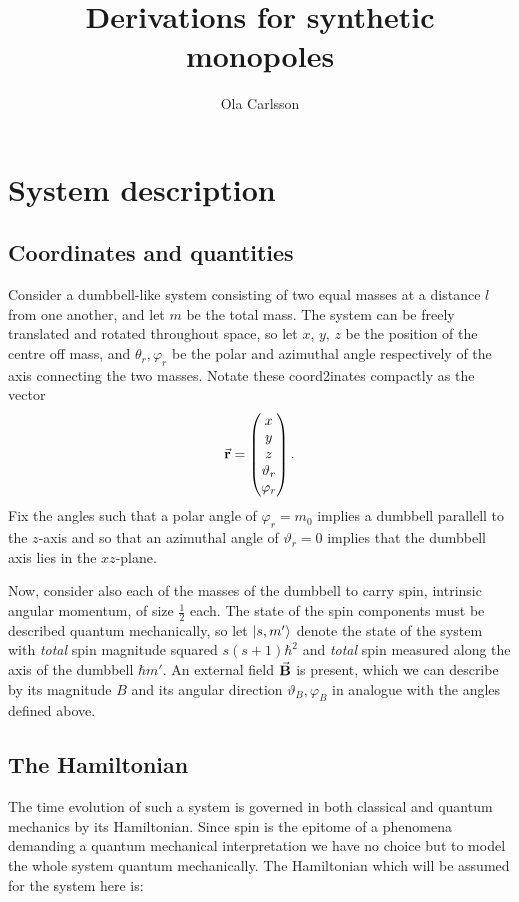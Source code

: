 \documentclass[a4paper]{article}
\title{Derivations for synthetic monopoles}
\author{Ola Carlsson}
\begin{document}
\section{System description}
\subsection{Coordinates and quantities}
Consider a dumbbell-like system consisting of two equal masses at a distance \(l\) from one
another, and let \(m\) be the total mass. The system can be freely translated and rotated
throughout space, so let \(x\), \(y\), \(z\)  be the position
of the centre off mass, and \(\theta_r, \varphi_r\) be the polar and azimuthal angle
respectively of the axis connecting the two masses. Notate these coord2inates compactly as the
vector \[
\va{r}
= \begin{pmatrix} x\\ y \\ z\\ \vartheta_r \\\varphi_r\end{pmatrix}
.\] 
Fix the angles such that a polar angle of \(\varphi_r = m_0\) implies a dumbbell parallell
to the \(z\)-axis and so that an azimuthal angle of \(\vartheta_r = 0\) implies that the dumbbell
axis lies in the \(xz\)-plane. 

Now, consider also each of the masses of the dumbbell to carry spin, intrinsic angular
momentum, of size \(\frac{1}{2}\) each. %
 The state of the spin components must be
described quantum mechanically, so let \(\ket{s, m'}\) denote the state of the system with
\textit{total} spin magnitude squared \(s(s+1)\hbar^2\) and \textit{total} spin measured
along the axis of the dumbbell \(\hbar m'\). An external field \(\va{B}\) is present, which
we can describe by its magnitude \(B\) and its angular direction \(\vartheta_B, \varphi_B\)
in analogue with the angles defined above.

\subsection{The Hamiltonian}

The time evolution of such a system is governed in both classical and quantum mechanics by
its Hamiltonian. Since spin is the epitome of a phenomena demanding a quantum mechanical
interpretation we have no choice but to model the whole system quantum mechanically.%
The Hamiltonian which will be assumed for the system here is:
\end{document}
